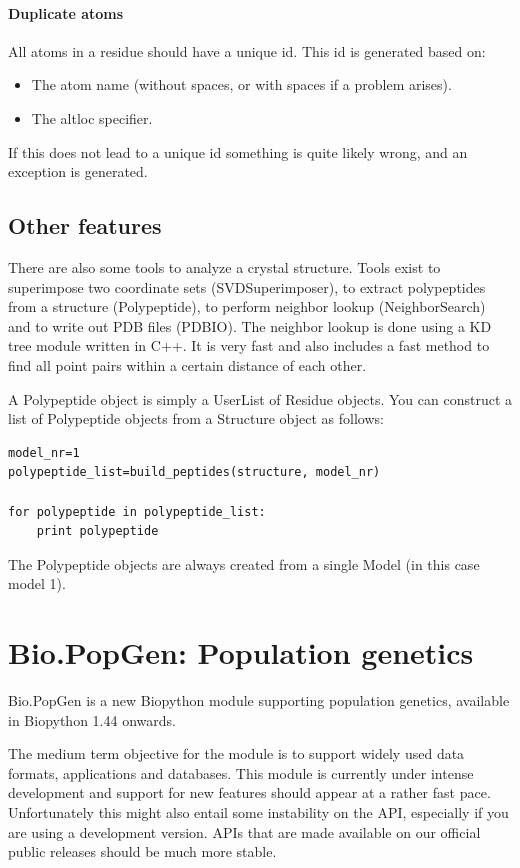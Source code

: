 \documentclass{report}
\begin{document}
\subsubsection{Duplicate atoms}

All atoms in a residue should have a unique id. This id is generated based on:

\begin{itemize}
\item The atom name (without spaces, or with spaces if a problem arises).
\item The altloc specifier.
\end{itemize}
If this does not lead to a unique id something is quite likely wrong, and an
exception is generated.

\section{Other features}

There are also some tools to analyze a crystal structure. Tools
exist to superimpose two coordinate sets (SVDSuperimposer), to extract
polypeptides from a structure (Polypeptide), to perform neighbor lookup
(NeighborSearch) and to write out PDB files (PDBIO). The neighbor lookup
is done using a KD tree module written in C++. It is very fast and also
includes a fast method to find all point pairs within a certain distance
of each other.

A Polypeptide object is simply a UserList of Residue objects. You can
construct a list of Polypeptide objects from a Structure object as follows:

\begin{verbatim}
model_nr=1
polypeptide_list=build_peptides(structure, model_nr)

for polypeptide in polypeptide_list:
    print polypeptide
\end{verbatim}

The Polypeptide objects are always created from a single
Model (in this case model 1).

\chapter{Bio.PopGen: Population genetics}

Bio.PopGen is a new Biopython module supporting population genetics,
available in Biopython 1.44 onwards.

The medium term objective for the module is to support widely used data
formats, applications and databases. This module is currently under intense
development and support for new features should appear at a rather fast pace.
Unfortunately this might also entail some instability on the API, especially
if you are using a development version. APIs that are made available on
our official public releases should be much more stable.
\end{document}
